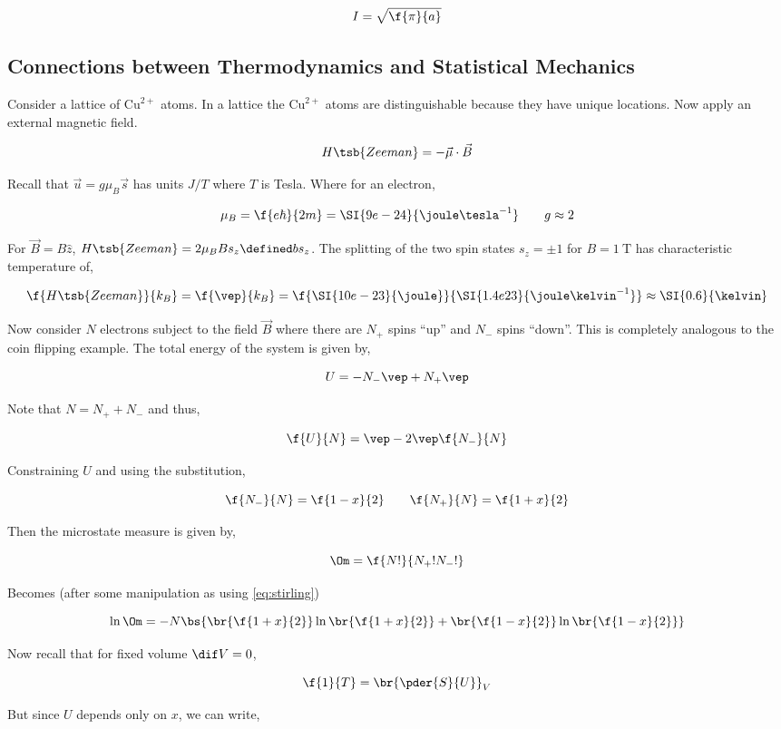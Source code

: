 \documentclass{article}
\begin{document}
\[ I = \sqrt{\f{\pi}{a}} \]

\subsection{Connections between Thermodynamics and Statistical Mechanics}

Consider a lattice of $\text{Cu}^{2+}$ atoms. In a lattice the $\text{Cu}^{2+}$ atoms are distinguishable because they have unique locations. Now apply an external magnetic field.

\[ H\tsb{Zeeman} = - \vec{\mu} \cdot \vec{B} \]

Recall that $\vec{u} = g \mu_B \vec{s}$ has units $J/T$ where $T$ is Tesla. Where for an electron,

\[ \mu_B = \f{e\hbar}{2m} = \SI{9e-24}{\joule \tesla^{-1}} \qquad g \approx 2 \]

For $\vec{B} = B \hat{z}$, $H\tsb{Zeeman} = 2\mu_BBs_z \defined b s_z$. The splitting of the two spin states $s_z = \pm 1$ for $B = \SI{1}{\tesla}$ has characteristic temperature of,

\[ \f{H\tsb{Zeeman}}{k_B} = \f{\vep}{k_B} = \f{\SI{10e-23}{\joule}}{\SI{1.4e23}{\joule\kelvin^{-1}}} \approx \SI{0.6}{\kelvin} \]

Now consider $N$ electrons subject to the field $\vec{B}$ where there are $N_+$ spins ``up'' and $N_-$ spins ``down''. This is completely analogous to the coin flipping example. The total energy of the system is given by,

\[ U = - N_- \vep + N_+ \vep \]

Note that $N = N_+ + N_-$ and thus,

\[ \f{U}{N} = \vep - 2 \vep \f{N_-}{N} \]

Constraining $U$ and using the substitution,

\[ \f{N_-}{N} = \f{1-x}{2} \qquad \f{N_+}{N} = \f{1+x}{2}\]

Then the microstate measure is given by,

\[ \Om = \f{N!}{N_+!N_-!} \]

Becomes (after some manipulation as using \eqref{eq:stirling})

\[ \ln\Om = -N\bs{\br{\f{1+x}{2}}\ln\br{\f{1+x}{2}} + \br{\f{1-x}{2}}\ln\br{\f{1-x}{2}}} \]

Now recall that for fixed volume $\dif V = 0$,

\[ \f{1}{T} = \br{\pder{S}{U}}_V \]

But since $U$ depends only on $x$, we can write,
\end{document}
